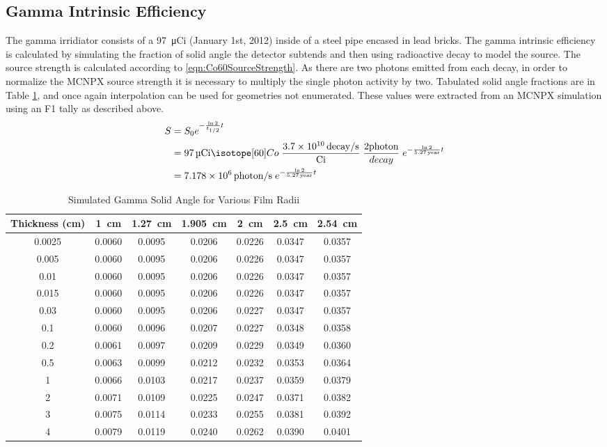 \subsection{Gamma Intrinsic Efficiency}
The gamma irridiator consists of a \SI{97}{\micro Ci}  (January 1st, 2012) inside of a steel pipe encased in lead bricks.
The gamma intrinsic efficiency is calculated by simulating the fraction of solid angle the detector subtends and then using radioactive decay to model the  source.
The  source strength is calculated according to \eqref{eqn:Co60SourceStrength}. 
As there are two photons emitted from each  decay, in order to normalize the MCNPX source strength it is necessary to multiply the single photon activity by two.
Tabulated solid angle fractions are in Table \ref{tab:GammaSolidAngle}, and once again interpolation can be used for geometries not enumerated.
These values were extracted from an MCNPX simulation using an F1 tally as described above.
\begin{align}
  \label{eqn:Co60SourceStrength}
  S &= S_0 e^{-\frac{\ln{2}}{t_{1/2}} t} \\ \notag 
    &= \SI{97}{\micro Ci} \iso[60]{Co}\; \frac{\SI{3.7E10}{decay\per\second}}{\si{Ci}} \;\frac{2\text{photon}}{decay}\;e^{-\frac{ \ln{2}}{\SI{5.27}{year}}t}  \\ \notag
    &= \SI{7.178E6}{photon\per\second}\;e^{-\frac{ \ln{2}}{\SI{5.27}{year}}t} 
\end{align}
\begin{table}
	\centering
	\caption{Simulated Gamma Solid Angle for Various Film Radii}
	\label{tab:GammaSolidAngle}
	\begin{tabular}{c | c c c c c c}
Thickness (\si{\cm})	&	\SI{1}{\cm}	&	\SI{1.27}{\cm}	&	\SI{1.905}{\cm}	&	\SI{2}{\cm}	&	\SI{2.5}{\cm}	&	\SI{2.54}{\cm} \\ \hline
0.0025	&	0.0060	&	0.0095	&	0.0206	&	0.0226	&	0.0347	&	0.0357\\
0.005	&	0.0060	&	0.0095	&	0.0206	&	0.0226	&	0.0347	&	0.0357\\
0.01	&	0.0060	&	0.0095	&	0.0206	&	0.0226	&	0.0347	&	0.0357\\
0.015	&	0.0060	&	0.0095	&	0.0206	&	0.0226	&	0.0347	&	0.0357\\
0.03	&	0.0060	&	0.0095	&	0.0206	&	0.0227	&	0.0347	&	0.0357\\
0.1	&	0.0060	&	0.0096	&	0.0207	&	0.0227	&	0.0348	&	0.0358\\
0.2	&	0.0061	&	0.0097	&	0.0209	&	0.0229	&	0.0349	&	0.0360\\
0.5	&	0.0063	&	0.0099	&	0.0212	&	0.0232	&	0.0353	&	0.0364\\
1	&	0.0066	&	0.0103	&	0.0217	&	0.0237	&	0.0359	&	0.0379\\
2	&	0.0071	&	0.0109	&	0.0225	&	0.0247	&	0.0371	&	0.0382\\
3	&	0.0075	&	0.0114	&	0.0233	&	0.0255	&	0.0381	&	0.0392\\
4	&	0.0079	&	0.0119	&	0.0240	&	0.0262	&	0.0390	&	0.0401\\
	\end{tabular}
\end{table}
